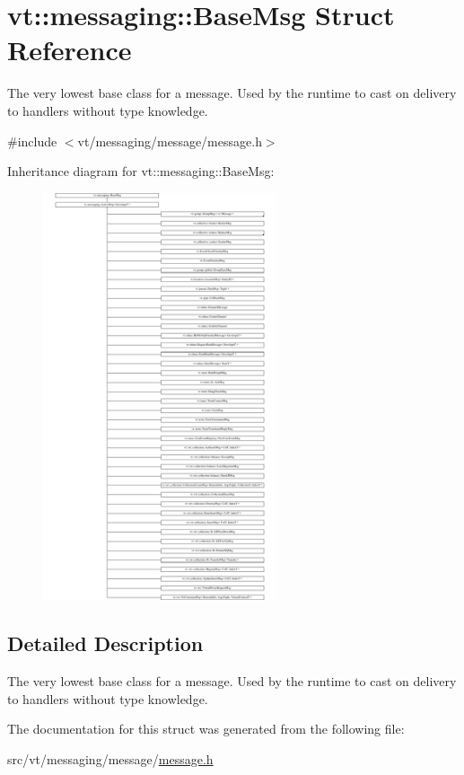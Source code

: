 \hypertarget{structvt_1_1messaging_1_1_base_msg}{}\section{vt\+:\+:messaging\+:\+:Base\+Msg Struct Reference}
\label{structvt_1_1messaging_1_1_base_msg}


The very lowest base class for a message. Used by the runtime to cast on delivery to handlers without type knowledge.  




{\ttfamily \#include $<$vt/messaging/message/message.\+h$>$}

Inheritance diagram for vt\+:\+:messaging\+:\+:Base\+Msg\+:\begin{figure}[H]
\begin{center}
\leavevmode
\includegraphics[height=12.000000cm]{structvt_1_1messaging_1_1_base_msg}
\end{center}
\end{figure}


\subsection{Detailed Description}
The very lowest base class for a message. Used by the runtime to cast on delivery to handlers without type knowledge. 

The documentation for this struct was generated from the following file\+:\begin{DoxyCompactItemize}
\item 
src/vt/messaging/message/\hyperlink{message_2message_8h}{message.\+h}\end{DoxyCompactItemize}
